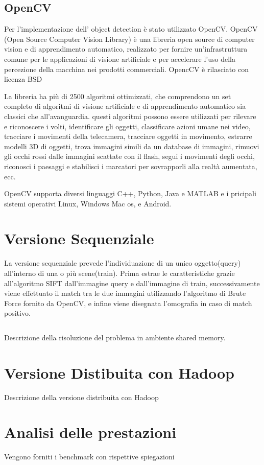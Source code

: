 \subsection{OpenCV}

Per l'implementazione dell' object detection è stato utilizzato OpenCV. OpenCV (Open Source Computer Vision Library) è una libreria open source di computer vision e di apprendimento automatico, realizzato per fornire un'infrastruttura comune per le applicazioni di visione artificiale e per accelerare l'uso della percezione della macchina nei prodotti commerciali. OpencCV è rilasciato con licenza BSD

\noindent La libreria ha più di 2500 algoritmi ottimizzati, che comprendono un set completo di algoritmi di visione artificiale e di apprendimento automatico sia classici che all'avanguardia. questi algoritmi possono essere utilizzati per rilevare e riconoscere i volti, identificare gli oggetti, classificare azioni umane nei video, tracciare i movimenti della telecamera, tracciare oggetti in movimento, estrarre modelli 3D di oggetti, trova immagini simili da un database di immagini, rimuovi gli occhi rossi dalle immagini scattate con il flash, segui i movimenti degli occhi, riconosci i paesaggi e stabilisci i marcatori per sovrapporli alla realtà aumentata, ecc.

\noindent OpenCV supporta diversi linguaggi C++, Python, Java e MATLAB e i pricipali sistemi operativi Linux, Windows Mac os, e Android.

\section{Versione Sequenziale}
La versione sequenziale prevede l'individuazione di un unico oggetto(query) all'interno di una o più scene(train). Prima estrae le caratteristiche grazie all'algoritmo SIFT dall'immagine query e dall'immagine di train, successivamente viene effettuato il match tra le due immagini utilizzando l'algoritmo di Brute Force fornito da OpenCV, e infine viene disegnata l'omografia in caso di match positivo.



\begin{lstlisting}

\end{lstlisting}

Descrizione della risoluzione del problema in ambiente shared memory.
\section{Versione Distibuita con Hadoop}
Descrizione della versione distribuita con Hadoop
\section{Analisi delle prestazioni}
Vengono forniti i benchmark con rispettive spiegazioni
